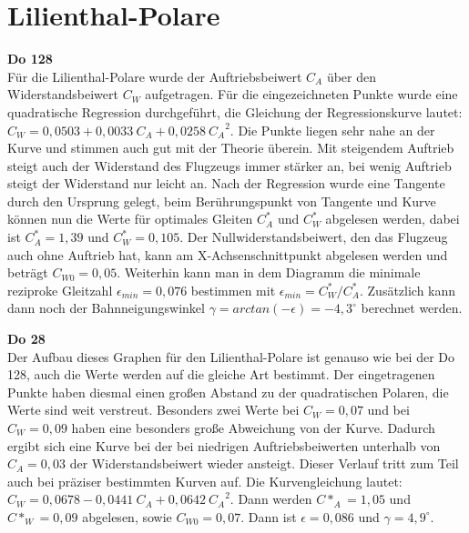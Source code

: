 \section{Lilienthal-Polare}
\textbf {Do 128}\\
Für die Lilienthal-Polare wurde der Auftriebsbeiwert $C_A$ über den Widerstandsbeiwert $C_W$ aufgetragen. Für die eingezeichneten Punkte wurde eine quadratische Regression durchgeführt, die Gleichung der Regressionskurve lautet: $C_W= 0,0503+0,0033\ C_A+0,0258\ {C_A}^2$. Die Punkte liegen sehr nahe an der Kurve und stimmen auch gut mit der Theorie überein. Mit steigendem Auftrieb steigt auch der Widerstand des Flugzeugs immer stärker an, bei wenig Auftrieb steigt der Widerstand nur leicht an. Nach der Regression wurde eine Tangente durch den Ursprung gelegt, beim Berührungspunkt von Tangente und Kurve können nun die Werte für optimales Gleiten $C_A^*$ und $C_W^*$ abgelesen werden, dabei ist $C_A^*=1,39$ und $C_W^*=0,105$. Der Nullwiderstandsbeiwert, den das Flugzeug auch ohne Auftrieb hat, kann am X-Achsenschnittpunkt abgelesen werden und beträgt $C_{W0}=0,05$. Weiterhin kann man in dem Diagramm die minimale reziproke Gleitzahl $\epsilon_{min}=0,076$ bestimmen mit $\epsilon_{min}= C_W^* / C_A^*$. Zusätzlich kann dann noch der Bahnneigungswinkel $\gamma=arctan(-\epsilon)=-4,3^\circ$ berechnet werden. 

\textbf {Do 28}\\
Der Aufbau dieses Graphen für den Lilienthal-Polare ist genauso wie bei der Do 128, auch die Werte werden auf die gleiche Art bestimmt. Der eingetragenen Punkte haben diesmal einen großen Abstand zu der quadratischen Polaren, die Werte sind weit verstreut. Besonders zwei Werte bei $C_W=0,07$ und bei $C_W=0,09$ haben eine besonders große Abweichung von der Kurve. Dadurch ergibt sich eine Kurve bei der bei niedrigen Auftriebsbeiwerten unterhalb von $C_A=0,03$ der Widerstandsbeiwert wieder ansteigt. Dieser Verlauf tritt zum Teil auch bei präziser bestimmten Kurven auf. Die Kurvengleichung lautet: $C_W= 0,0678-0,0441\ C_A+0,0642\ {C_A}^2$. Dann werden $C*_A=1,05$ und $C*_W=0,09$ abgelesen, sowie $C_{W0} =0,07$. Dann ist $\epsilon=0,086$ und $\gamma=4,9^\circ$. 

